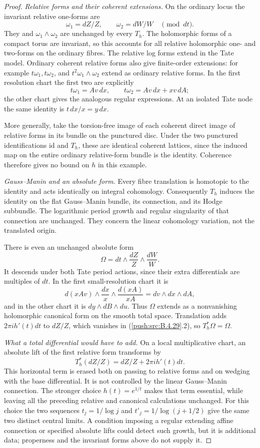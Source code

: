 \begin{proof}
\emph{Relative forms and their coherent extensions.}
On the ordinary locus the invariant relative
one-forms are
\[
 \omega_1=dZ/Z,\qquad \omega_2=dW/W
 \quad\pmod{dt}.
\]
They and $\omega_1\wedge\omega_2$ are
unchanged by every $T_h$. The holomorphic
forms of a compact torus are invariant, so
this accounts for all relative holomorphic
one- and two-forms on the ordinary fibres.
The relative log forms extend in the Tate
model. Ordinary coherent relative forms
also give finite-order extensions: for
example $t\omega_1,t\omega_2$, and
$t^2\omega_1\wedge\omega_2$ extend as
ordinary relative forms. In the first
resolution chart the first two are explicitly
\[
 t\omega_1=Av\,dx,\qquad
 t\omega_2=Av\,dx+xv\,dA;
\]
the other chart gives the analogous regular
expressions. At an isolated Tate node the
same identity is $t\,dx/x=y\,dx$.

More generally, take the torsion-free image
of each coherent direct image of relative
forms in its bundle on the punctured disc.
Under the two punctured identifications
$\mathrm{id}$ and $T_h$, these are identical
coherent lattices, since the induced map on
the entire ordinary relative-form bundle
is the identity. Coherence therefore gives
no bound on $h$ in this example.

\emph{Gauss--Manin and an absolute form.}
Every fibre translation is homotopic to the
identity and acts identically on integral
cohomology. Consequently $T_h$ induces the
identity on the flat Gauss--Manin bundle,
its connection, and its Hodge subbundle.
The logarithmic period growth and regular
singularity of that connection are unchanged.
They concern the linear cohomology variation,
not the translated origin.

There is even an unchanged absolute form
\[
 \Omega=dt\wedge\frac{dZ}{Z}\wedge\frac{dW}{W}.
 \tag{B.4.29.2}
\]
It descends under both Tate period actions,
since their extra differentials are multiples
of $dt$. In the first small-resolution chart
it is
\[
 d(xAv)\wedge\frac{dx}{x}
          \wedge\frac{d(xA)}{xA}
       =dv\wedge dx\wedge dA,
\]
and in the other chart it is
$dy\wedge dB\wedge du$.
Thus $\Omega$ extends as a nonvanishing
holomorphic canonical form on the smooth
total space. Translation adds
$2\pi i h'(t)dt$ to $dZ/Z$, which vanishes
in (\ref{push:src:B.4.29}.2), so $T_h^*\Omega=\Omega$.

\emph{What a total differential would have to add.}
On a local multiplicative chart, an absolute
lift of the first relative form transforms by
\[
 T_h^*(dZ/Z)=dZ/Z+2\pi i h'(t)dt.
 \tag{B.4.29.3}
\]
This horizontal term is erased both on passing
to relative forms and on wedging with the base
differential. It is not controlled by the
linear Gauss--Manin connection. The stronger
choice $h(t)=e^{1/t}$ makes that term
essential, while leaving all the preceding
relative and canonical calculations unchanged.
For this choice the two sequences
$t_j=1/\log j$ and
$t'_j=1/\log(j+1/2)$ give the same two
distinct central limits. A condition imposing
a regular extending affine connection or
specified absolute lifts could detect such
growth, but it is additional data; properness
and the invariant forms above do not supply it.


\end{proof}
